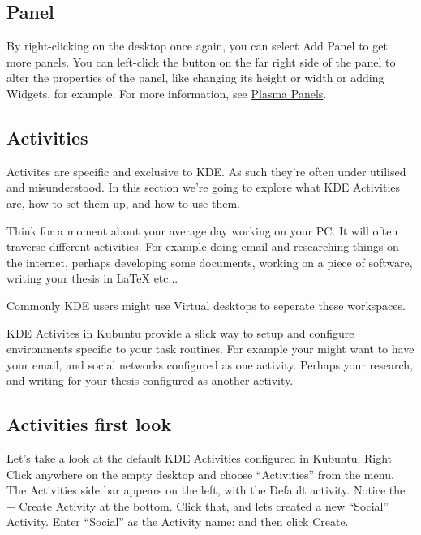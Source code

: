\documentclass[letterpaper,10pt,english]{sphinxmanual}
\begin{document}
\subsection{Panel}
\label{docs/basic:panel}
By right-clicking on the desktop once again, you can select Add Panel to get more panels. You can left-click the button on the far right side of the panel to alter the properties of the panel, like changing its height or width or adding Widgets, for example. For more information, see \href{https://userbase.kde.org/Special:MyLanguage/Plasma\#Panels}{Plasma Panels}.


\subsection{Activities}
\label{docs/basic:activities}
Activites are specific and exclusive to KDE. As such they're often under utilised and misunderstood. In this section we're going to explore what KDE Activities are, how to set them up, and how to use them.

Think for a moment about your average day working on your PC. It will often traverse different activities. For example doing email and researching things on the internet, perhaps developing some documents, working on a piece of software, writing your thesis in LaTeX etc...

Commonly KDE users might use Virtual desktops to seperate these workspaces.

KDE Activites in Kubuntu provide a slick way to setup and configure environments specific to your task routines. For example your might want to have your email, and social networks configured as one activity. Perhaps your research, and writing for your thesis configured as another activity.


\subsection{Activities first look}
\label{docs/basic:activities-first-look}

Let's take a look at the default KDE Activities configured in Kubuntu. Right Click anywhere on the empty desktop and choose ``Activities'' from the menu. The Activities side bar appears on the left, with the Default activity. Notice the + Create Activity at the bottom. Click that, and lets created a new ``Social'' Activity.
Enter ``Social'' as the Activity name: and then click Create.
\end{document}
